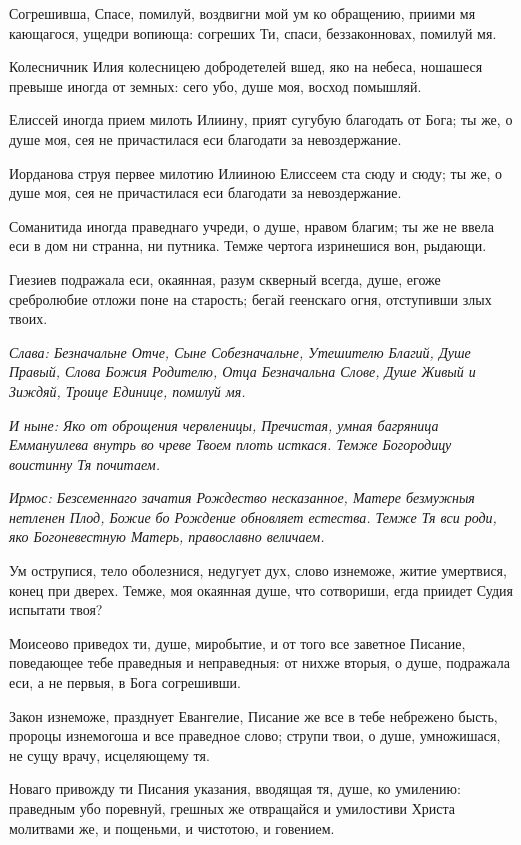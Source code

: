 Согрешивша, Спасе, помилуй, воздвигни мой ум ко обращению, приими мя кающагося, ущедри вопиюща: согреших Ти, спаси, беззаконновах, помилуй мя. 

Колесничник Илия колесницею добродетелей вшед, яко на небеса, ношашеся превыше иногда от земных: сего убо, душе моя, восход помышляй. 

Елиссей иногда прием милоть Илиину, прият сугубую благодать от Бога; ты же, о душе моя, сея не причастилася еси благодати за невоздержание. 

Иорданова струя первее милотию Илииною Елиссеем ста сюду и сюду; ты же, о душе моя, сея не причастилася еси благодати за невоздержание. 

Соманитида иногда праведнаго учреди, о душе, нравом благим; ты же не ввела еси в дом ни странна, ни путника. Темже чертога изринешися вон, рыдающи. 

Гиезиев подражала еси, окаянная, разум скверный всегда, душе, егоже сребролюбие отложи поне на старость; бегай геенскаго огня, отступивши злых твоих. 

\itshape Слава\normalfont{}: Безначальне Отче, Сыне Собезначальне, Утешителю Благий, Душе Правый, Слова Божия Родителю, Отца Безначальна Слове, Душе Живый и Зиждяй, Троице Единице, помилуй мя. 

\itshape И ныне\normalfont{}: Яко от оброщения червленицы, Пречистая, умная багряница Еммануилева внутрь во чреве Твоем плоть исткася. Темже Богородицу воистинну Тя почитаем. 


\itshape Ирмос\normalfont{}: Безсеменнаго зачатия Рождество несказанное, Матере безмужныя нетленен Плод, Божие бо Рождение обновляет естества. Темже Тя вси роди, яко Богоневестную Матерь, православно величаем. 

Ум острупися, тело оболезнися, недугует дух, слово изнеможе, житие умертвися, конец при дверех. Темже, моя окаянная душе, что сотвориши, егда приидет Судия испытати твоя? 

Моисеово приведох ти, душе, миробытие, и от того все заветное Писание, поведающее тебе праведныя и неправедныя: от нихже вторыя, о душе, подражала еси, а не первыя, в Бога согрешивши. 

Закон изнеможе, празднует Евангелие, Писание же все в тебе небрежено бысть, пророцы изнемогоша и все праведное слово; струпи твои, о душе, умножишася, не сущу врачу, исцеляющему тя. 

Новаго привожду ти Писания указания, вводящая тя, душе, ко умилению: праведным убо поревнуй, грешных же отвращайся и умилостиви Христа молитвами же, и пощеньми, и чистотою, и говением. 

